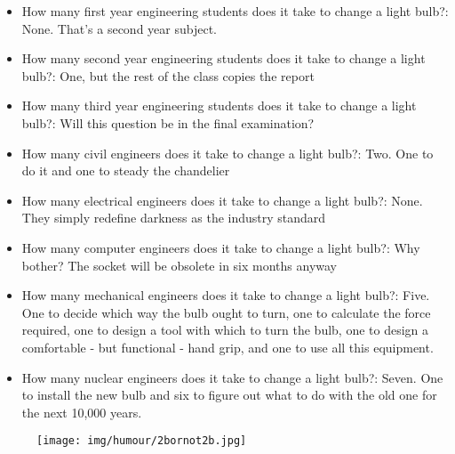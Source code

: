 \begin{itemize} 
	\item How many first year engineering students does it take to change a light bulb?: None. That's a second year subject.

	\item How many second year engineering students does it take to change a light bulb?: One, but the rest of the class copies the report

	\item How many third year engineering students does it take to change a light bulb?: Will this question be in the final examination?

	\item How many civil engineers does it take to change a light bulb?: Two. One to do it and one to steady the chandelier

	\item How many electrical engineers does it take to change a light bulb?: None. They simply redefine darkness as the industry standard

	\item How many computer engineers does it take to change a light bulb?: Why bother? The socket will be obsolete in six months anyway

	\item How many mechanical engineers does it take to change a light bulb?: Five. One to decide which way the bulb ought to turn, one to calculate the force required, one to design a tool with which to turn the bulb, one to design a comfortable - but functional - hand grip, and one to use all this equipment. 

	\item How many nuclear engineers does it take to change a light bulb?: Seven. One to install the new bulb and six to figure out what to do with the old one for the next 10,000 years. 
\end{itemize}

\begin{center}\underline{\hspace{5 cm}}\end{center}

	\begin{figure}[H]
		\centering
		\texttt{[image: img/humour/2bornot2b.jpg]}
	\end{figure}
	
\begin{center}\underline{\hspace{5 cm}}\end{center}

